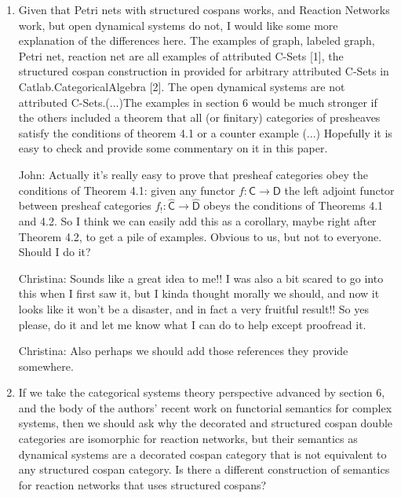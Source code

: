 \documentclass[reqno]{amsart}
\def\chris{\color{purple} Christina: }
\def\john{\color{red} John: }
\begin{document}
\begin{enumerate}
{\chris By the way, there is this sentence ''However, it should be clear by now that so
far, in cases where either structured or decorated cospans can be used, structured cospans are simpler. '' in section 6. Perhaps we could even imply 
that somewhere in the intro as well?}

\item Given that Petri nets with structured cospans works, and Reaction Networks work, but open dynamical systems do not, I would like some more 
explanation of the differences here. The examples of graph, labeled 
graph, Petri net, reaction net are all examples of attributed C-Sets [1], the structured cospan construction in provided for arbitrary attributed 
C-Sets in Catlab.CategoricalAlgebra [2]. The open dynamical systems are not attributed C-Sets.(...)The examples in section 6 would be much stronger 
if the others included a theorem that all (or finitary) categories of presheaves satisfy the 
conditions of theorem 4.1 or a counter example (...) Hopefully it is easy to check and provide some 
commentary 
on it in this paper.

{\john Actually it's really easy to prove that presheaf categories obey the conditions of Theorem 4.1:
given any functor $f : \mathsf{C} \to \mathsf{D}$ the left adjoint functor between presheaf categories $f_! : \widehat{\mathsf{C}} \to \widehat{\mathsf{D}}$ obeys the conditions of Theorems 4.1 and 4.2.   So I think we can easily add this as a corollary, maybe right after Theorem 4.2, to get a pile of examples.   Obvious to us, but not to everyone.  Should I do it?}

{\chris Sounds like a great idea to me!! I was also a bit scared to go into this when I first saw it, but I kinda thought morally we should, and now 
it looks like it won't be a disaster, and in fact a very fruitful result!! So yes please, do it and let me know what I can do to help except 
proofread it.}

{\chris Also perhaps we should add those references they provide somewhere.}

\item If we take the categorical systems theory perspective advanced by section 6, and the body of the authors’ recent work on functorial semantics 
for complex 
systems, then we should ask why the decorated and structured cospan double categories are isomorphic for reaction networks, but their semantics as 
dynamical systems are a decorated cospan category that is not equivalent to any structured cospan category. Is there a different construction of 
semantics for reaction networks that uses structured cospans?


\end{enumerate}
\end{document}

